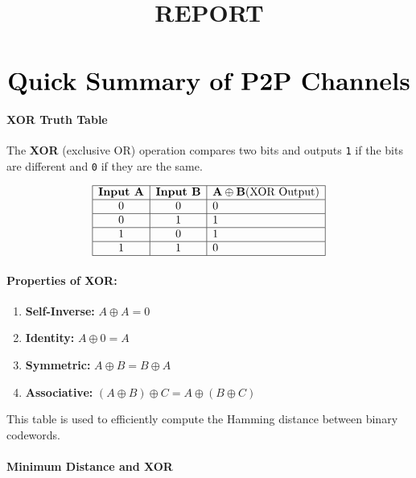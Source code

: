 \documentclass[11pt]{article}
\title{REPORT}
\providecommand{\tightlist}{%
      \setlength{\itemsep}{0pt}\setlength{\parskip}{0pt}}
\begin{document}
    
    \maketitle
    
    

    
    \(\Huge\textbf{Quick Summary of P2P Channels}\)

    \paragraph{\texorpdfstring{\textbf{XOR Truth
Table}}{XOR Truth Table}}\label{xor-truth-table}

The \textbf{XOR} (exclusive OR) operation compares two bits and outputs
\texttt{1} if the bits are different and \texttt{0} if they are the
same.

\[
\begin{array}{|c|c|l|} 
\hline \textbf{Input A} & \textbf{Input B} & \textbf{A} \oplus \textbf{B} \text{(XOR Output)} \\
\hline  0 & 0 & 0 \\
\hline  0 & 1 & 1 \\
\hline  1 & 0 & 1 \\
\hline  1 & 1 & 0 \\
\hline 
\end{array}
\]

\paragraph{\texorpdfstring{\textbf{Properties of
XOR:}}{Properties of XOR:}}\label{properties-of-xor}

\begin{enumerate}
\def\labelenumi{\arabic{enumi}.}
\tightlist
\item
  \textbf{Self-Inverse:} \(A \oplus A = 0\)
\item
  \textbf{Identity:} \(A \oplus 0 = A\)
\item
  \textbf{Symmetric:} \(A \oplus B = B \oplus A\)
\item
  \textbf{Associative:}
  \((A \oplus B) \oplus C = A \oplus (B \oplus C)\)
\end{enumerate}

This table is used to efficiently compute the Hamming distance between
binary codewords.

\paragraph{\texorpdfstring{\textbf{Minimum Distance and
XOR}}{Minimum Distance and XOR}}\label{minimum-distance-and-xor}
\end{document}
